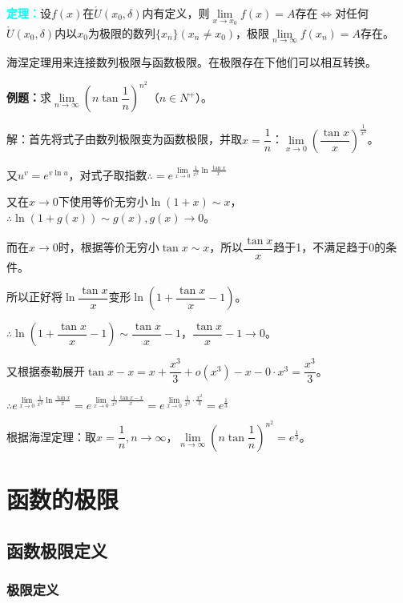 \documentclass[UTF8, 12pt]{ctexart}
\begin{document}
        \textcolor{aqua}{\textbf{定理：}}设$f(x)$在$\mathring{U}(x_0,\delta)$内有定义，则$\lim\limits_{x\to x_0}f(x)=A$存在$\Leftrightarrow$对任何$\mathring{U}(x_0,\delta)$内以$x_0$为极限的数列$\{x_n\}(x_n\neq x_0)$，极限$\lim\limits_{n\to\infty}f(x_n)=A$存在。

        海涅定理用来连接数列极限与函数极限。在极限存在下他们可以相互转换。

        \textbf{例题：}求$\lim\limits_{n\to\infty}\left(n\tan\dfrac{1}{n}\right)^{n^2}$（$n\in N^+$）。

        解：首先将式子由数列极限变为函数极限，并取$x=\dfrac{1}{n}$：$\lim\limits_{x\to 0}\left(\dfrac{\tan x}{x}\right)^{\frac{1}{x^2}}$。

        又$u^v=e^{v\ln u}$，对式子取指数$\therefore =e^{\lim\limits_{x\to 0}\frac{1}{x^2}\ln\frac{\tan x}{x}}$

        又在$x\to 0$下使用等价无穷小$\ln (1+x)\sim x$，$\therefore \ln(1+g(x))\sim g(x),g(x)\to 0$。

        而在$x\to 0$时，根据等价无穷小$\tan x\sim x$，所以$\dfrac{\tan x}{x}$趋于1，不满足趋于0的条件。

        所以正好将$\ln\dfrac{\tan x}{x}$变形$\ln\left(1+\dfrac{\tan x}{x}-1\right)$。

        $\therefore \ln\left(1+\dfrac{\tan x}{x}-1\right)\sim\dfrac{\tan x}{x}-1$，$\dfrac{\tan x}{x}-1\to 0$。

        又根据泰勒展开$\tan x-x=x+\dfrac{x^3}{3}+o(x^3)-x-0\cdot x^3=\dfrac{x^3}{3}$。

        $\therefore e^{\lim\limits_{x\to 0}\frac{1}{x^2}\ln\frac{\tan x}{x}}=e^{\lim\limits_{x\to 0}\frac{1}{x^2}\frac{\tan x-x}{x}}=e^{\lim\limits_{x\to 0}\frac{1}{x^2}\cdot\frac{x^2}{3}}=e^{\frac{1}{3}}$

        根据海涅定理：取$x=\dfrac{1}{n},n\to\infty$，$\lim\limits_{n\to\infty}\left(n\tan\dfrac{1}{n}\right)^{n^2}=e^{\frac{1}{3}}$。

        \section{函数的极限}

        \subsection{函数极限定义}

        \subsubsection{极限定义}
\end{document}
